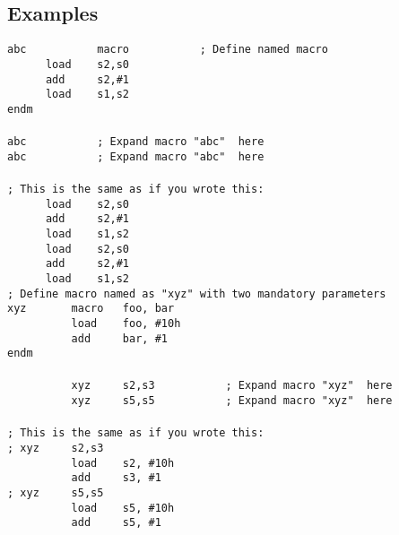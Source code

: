     \subsection{Examples}
        \verb'abc           macro           ; Define named macro '\\
        \verb'      load    s2,s0'\\
        \verb'      add     s2,#1'\\
        \verb'      load    s1,s2'\\
        \verb'endm'\\\\
        \verb'abc           ; Expand macro "abc"  here'\\
        \verb'abc           ; Expand macro "abc"  here'\\\\
        \verb'; This is the same as if you wrote this:'\\
        \verb'      load    s2,s0'\\
        \verb'      add     s2,#1'\\
        \verb'      load    s1,s2'\\
        \verb'      load    s2,s0'\\
        \verb'      add     s2,#1'\\
        \verb'      load    s1,s2'\\

        \verb'; Define macro named as "xyz" with two mandatory parameters'\\
        \verb'xyz       macro   foo, bar'\\
        \verb'          load    foo, #10h'\\
        \verb'          add     bar, #1'\\
        \verb'endm'\\\\
        \verb'          xyz     s2,s3           ; Expand macro "xyz"  here'\\
        \verb'          xyz     s5,s5           ; Expand macro "xyz"  here'\\\\
        \verb'; This is the same as if you wrote this:'\\
        \verb'; xyz     s2,s3'\\
        \verb'          load    s2, #10h'\\
        \verb'          add     s3, #1'\\
        \verb'; xyz     s5,s5'\\
        \verb'          load    s5, #10h'\\
        \verb'          add     s5, #1'\\

